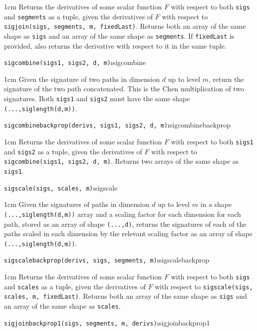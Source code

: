 \documentclass[a4paper]{extarticle}
\newenvironment{defn}{\begin{adjustwidth}{1cm}{}\ignorespaces}{\end{adjustwidth}\ignorespacesafterend}
\begin{document}
\begin{defn}
\nopagebreak Returns the derivatives of some scalar function $F$ with respect to both \verb|sigs| and \verb|segments| as a tuple, given %
the derivatives of $F$ with respect to \verb!sigjoin(sigs, segments, m, fixedLast)!. Returns both an array of the same shape as \verb|sigs| and an array of the same shape as \verb|segments|. If \verb|fixedLast| is provided, also returns the derivative with respect to it in the same tuple.
\end{defn}
\verb!sigcombine(sigs1, sigs2, d, m)!\i{sigcombine}

\begin{defn}
\nopagebreak Given the signature of two paths in dimension $d$ up to level $m$, return the signature of the two path concatenated. This is the Chen multiplication of two signatures. Both \verb|sigs1| and \verb|sigs2| must have the same shape \verb|(...,siglength(d,m))|.
\end{defn}
\verb!sigcombinebackprop(derivs, sigs1, sigs2, d, m)!\i{sigcombinebackprop}

\begin{defn}
\nopagebreak Returns the derivatives of some scalar function $F$ with respect to both \verb|sigs1| and \verb|sigs2| as a tuple, given %
the derivatives of $F$ with respect to \verb!sigcombine(sigs1, sigs2, d, m)!. Returns two arrays of the same shape as \verb|sigs1|.
\end{defn}
\verb!sigscale(sigs, scales, m)!\i{sigscale}
\begin{defn}
	\nopagebreak Given the signatures of paths in dimension $d$ up to level $m$ in a shape \verb|(...,siglength(d,m))| array and a scaling factor for each dimension for each path, stored as an array of shape \verb|(...,d)|, returns the signatures of each of the paths scaled in each dimension by the relevant scaling factor as an array of shape \verb|(...,siglength(d,m))|. 
\end{defn}
\verb!sigscalebackprop(derivs, sigs, segments, m)!\i{sigscalebackprop}

\begin{defn}
	\nopagebreak Returns the derivatives of some scalar function $F$ with respect to both \verb|sigs| and \verb|scales| as a tuple, given %
	the derivatives of $F$ with respect to \verb!sigscale(sigs, scales, m, fixedLast)!. Returns both an array of the same shape as \verb|sigs| and an array of the same shape as \verb|scales|. 
\end{defn}
\iffalse
\verb!sigjoinbackprop1(sigs, segments, m, derivs)!\i{sigjoinbackprop1}
\end{document}
